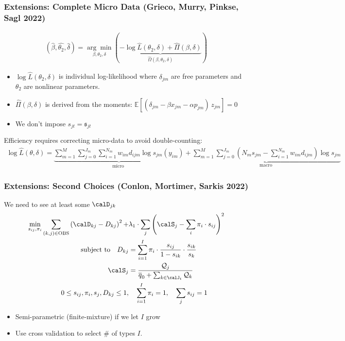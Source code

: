 \begin{frame} \frametitle{Extensions: Complete Micro Data (Grieco, Murry, Pinkse, Sagl 2022)}
\footnotesize
\begin{align*}
(\hat{\beta}, \hat{\theta_2}, \hat{\delta})=\underset{\beta, \theta_2, \delta}{\arg \min }(\underbrace{-\log \hat{L}(\theta_2, \delta)+\hat{\Pi}(\beta, \delta)}_{\hat{\Omega}(\beta, \theta_2, \delta)})
\end{align*}
\begin{itemize}
\item $\log \hat{L}(\theta_2, \delta)$ is individual log-likelihood where $\delta_{jm}$ are free parameters and $\theta_2$ are nonlinear parameters.
\item $\hat{\Pi}(\beta,\delta)$ is derived from the moments: $\mathbb{E}[\left(\delta_{jm}-\beta x_{jm} - \alpha p_{jm}\right)\, z_{jm}]=0$
\item We don't impose $s_{jt} = \mathfrak{s}_{jt}$
\end{itemize}
Efficiency requires correcting micro-data to avoid double-counting:
\begin{align*}
\log \hat{L}(\theta, \delta)=\underbrace{\sum_{m=1}^M \sum_{j=0}^{J_m} \sum_{i=1}^{N_m} w_{i m} d_{i j m} \log s_{j m}(y_{i m})}_{\text {micro }}+\underbrace{\sum_{m=1}^M \sum_{j=0}^{J_m}\left(N_m s_{j m}-\sum_{i=1}^{N_m} w_{i m} d_{i j m}\right) \log s_{j m}}_{\text {macro }}
\end{align*}
\end{frame}

\begin{frame} \frametitle{Extensions: Second Choices (Conlon, Mortimer, Sarkis 2022)}
\small
We need to see at least some $\calD_{jk}$
\begin{align*}
\min_{s_{ij}, \pi_i}\sum_{(k,j) \in \text{OBS}} \left( \calD_{kj} - D_{kj}\right)^2+ & \lambda_1 \cdot  \sum_j \left(\calS_j - \sum_i \pi_i \cdot s_{ij} \right)^2\\ %
\text{subject to} \quad 
\nonumber    D_{kj} &= \sum_{i=1}^I \pi_i \cdot \frac{s_{ij}}{1-s_{ik}} \cdot \frac{s_{ik}}{s_{k}}\\
\nonumber    \calS_j &= \frac{\mathcal{Q}_j }{\overline{q}_0 +\sum_{k \in \calJ_t} \mathcal{Q}_k}  \\
\nonumber   0\leq s_{ij}, \pi_i, s_j, D_{kj} \leq 1,& \quad
   \sum_{i=1}^I \pi_i = 1,\quad
   \sum_j s_{ij} = 1 
\end{align*}
\vspace{-.25cm}
\begin{itemize} 
  \item Semi-parametric (finite-mixture) if we let $I$ grow
\item Use cross validation to select \# of types $I$.
\end{itemize}
\end{frame}




